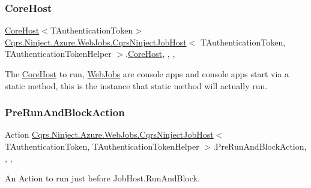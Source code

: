 \subsubsection{\texorpdfstring{Core\+Host}{CoreHost}}
{\footnotesize\ttfamily \hyperlink{classCqrs_1_1Hosts_1_1CoreHost}{Core\+Host}$<$T\+Authentication\+Token$>$ \hyperlink{classCqrs_1_1Ninject_1_1Azure_1_1WebJobs_1_1CqrsNinjectJobHost}{Cqrs.\+Ninject.\+Azure.\+Web\+Jobs.\+Cqrs\+Ninject\+Job\+Host}$<$ T\+Authentication\+Token, T\+Authentication\+Token\+Helper $>$.\hyperlink{classCqrs_1_1Hosts_1_1CoreHost}{Core\+Host}\hspace{0.3cm}{\ttfamily [static]}, {\ttfamily [get]}, {\ttfamily [set]}, {\ttfamily [protected]}}



The \hyperlink{classCqrs_1_1Ninject_1_1Azure_1_1WebJobs_1_1CqrsNinjectJobHost_a2c166839548b7c238a9462b46bd8e555_a2c166839548b7c238a9462b46bd8e555}{Core\+Host} to run, \hyperlink{namespaceCqrs_1_1Ninject_1_1Azure_1_1WebJobs}{Web\+Jobs} are console apps and console apps start via a static method, this is the instance that static method will actually run. 

\mbox{\label{classCqrs_1_1Ninject_1_1Azure_1_1WebJobs_1_1CqrsNinjectJobHost_a16eceaa51739d5baff6e4986ed822d8f_a16eceaa51739d5baff6e4986ed822d8f}} 
\subsubsection{\texorpdfstring{Pre\+Run\+And\+Block\+Action}{PreRunAndBlockAction}}
{\footnotesize\ttfamily Action \hyperlink{classCqrs_1_1Ninject_1_1Azure_1_1WebJobs_1_1CqrsNinjectJobHost}{Cqrs.\+Ninject.\+Azure.\+Web\+Jobs.\+Cqrs\+Ninject\+Job\+Host}$<$ T\+Authentication\+Token, T\+Authentication\+Token\+Helper $>$.Pre\+Run\+And\+Block\+Action\hspace{0.3cm}{\ttfamily [static]}, {\ttfamily [get]}, {\ttfamily [set]}, {\ttfamily [protected]}}



An Action to run just before Job\+Host.\+Run\+And\+Block. 

